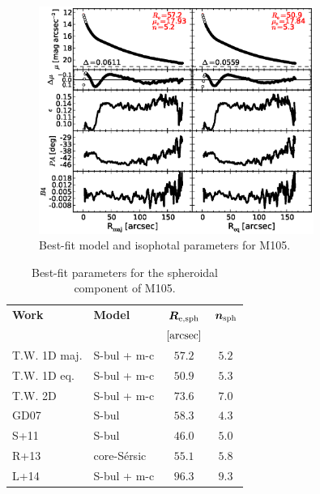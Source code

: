 \documentclass[preprint2]{emulateapj}
\newcommand{\fitfigurewidth}{0.8\textwidth}
\begin{document}
  \begin{figure}[h]
  \begin{center}
  \includegraphics[width=\fitfigurewidth]{images/m105_1Dfit.eps}
  \caption{Best-fit model and isophotal parameters for M105.}
  \end{center}
  \end{figure}

  \begin{table}[h]
  \small
  \caption{Best-fit parameters for the spheroidal component of M105.}
  \begin{center}
  \begin{tabular}{llcc}
  \hline
  {\bf Work} & {\bf Model}   & $\bm R_{\rm e,sph}$    & $\bm n_{\rm sph}$ \\
    &  &  $[\rm arcsec]$ & \\
  \hline
  T.W. 1D maj. & S-bul + m-c & $57.2$  &  $5.2$ \\
  T.W. 1D eq.  & S-bul + m-c & $50.9$  &  $5.3$ \\
  T.W. 2D      & S-bul + m-c & $73.6$  &  $7.0$ \\
  \hline
  GD07         & S-bul & $58.3$  &  $4.3$ \\
  S+11         & S-bul & $46.0$  &  $5.0$ \\
  R+13         & core-S\'ersic & $55.1$  &  $5.8$ \\
  L+14         & S-bul + m-c & $96.3$  &  $9.3$ \\
  \hline
  \end{tabular}
  \end{center}
  \label{tab:m105}
  \end{table}
\end{document}
